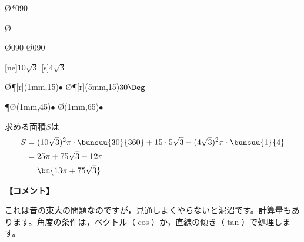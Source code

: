 \documentclass[b5j]{jarticle}
\begin{document}
\begin{multicols*}{2}
\begin{caprm}
\begin{center}
\begin{zahyou}[haiti=t,ul=2mm,yokozikukigou={$x$},tatezikukigou={$y$},gentenhaiti={[sw]},yokozikuhaiti={[s]},tatezikuhaiti={[e]}]
\Put\O{\ougigata**{\rb}{0}{90}}

\Nuritubusi[0]{\B\A\D\E}
\Nuritubusi[0]{\B\C\F\G}
\Put\O{}

\Drawlines{\A\B\C}
\Drawlines{\P\O\Q}
\Enko\O{\ra}{0}{90}
\Enko\O{\rb}{0}{90}

\Put{}
\Put{}
[ne]{$10\sqrt 3$}
[s]{$4\sqrt 3$}

\A\O\P[r](1mm,15){$\bullet$}
\A\O\P[r](5mm,15){$30\Deg$}

\P\O\Q[r](1mm,45){$\bullet$}
\Q\O\C[r](1mm,65){$\bullet$}
\end{zahyou}
\end{center}


\end{caprm}
求める面積$S$は
\begin{align*}
S&=(10\sqrt3)^2\pi\cdot\bunsuu{30}{360}+15\cdot5\sqrt 3-(4\sqrt3)^2\pi\cdot\bunsuu{1}{4}\\
&=25\pi+75\sqrt 3-12\pi\\
&=\bm{13\pi+75\sqrt 3}
\end{align*}

{\bf 【コメント】}

これは昔の東大の問題なのですが，見通しよくやらないと泥沼です。計算量もあります。角度の条件は，ベクトル（$\cos$）か，直線の傾き（$\tan$）で処理します。
\end{multicols*}
\newpage
\end{document}
